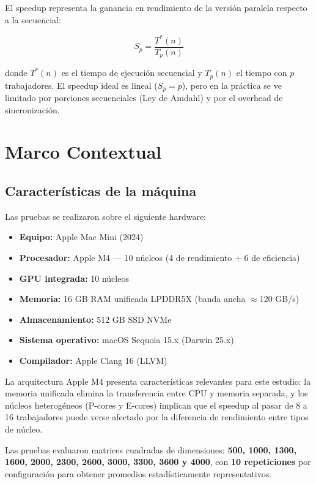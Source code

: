 \documentclass{article}
\begin{document}
El speedup representa la ganancia en rendimiento de la versión paralela respecto a la secuencial:

\[ S_p = \frac{T^*(n)}{T_p(n)} \]

donde $T^*(n)$ es el tiempo de ejecución secuencial y $T_p(n)$ el tiempo con $p$ trabajadores. El speedup ideal es lineal ($S_p = p$), pero en la práctica se ve limitado por porciones secuenciales (Ley de Amdahl) y por el overhead de sincronización.

\section{Marco Contextual}

\subsection{Características de la máquina}

Las pruebas se realizaron sobre el siguiente hardware:

\begin{itemize}
    \item \textbf{Equipo:} Apple Mac Mini (2024)
    \item \textbf{Procesador:} Apple M4 --- 10 núcleos (4 de rendimiento + 6 de eficiencia)
    \item \textbf{GPU integrada:} 10 núcleos
    \item \textbf{Memoria:} 16 GB RAM unificada LPDDR5X (banda ancha $\approx$120 GB/s)
    \item \textbf{Almacenamiento:} 512 GB SSD NVMe
    \item \textbf{Sistema operativo:} macOS Sequoia 15.x (Darwin 25.x)
    \item \textbf{Compilador:} Apple Clang 16 (LLVM)
\end{itemize}

La arquitectura Apple M4 presenta características relevantes para este estudio: la memoria unificada elimina la transferencia entre CPU y memoria separada, y los núcleos heterogéneos (P-cores y E-cores) implican que el speedup al pasar de 8 a 16 trabajadores puede verse afectado por la diferencia de rendimiento entre tipos de núcleo.

Las pruebas evaluaron matrices cuadradas de dimensiones: \textbf{500, 1000, 1300, 1600, 2000, 2300, 2600, 3000, 3300, 3600 y 4000}, con \textbf{10 repeticiones} por configuración para obtener promedios estadísticamente representativos.
\end{document}
